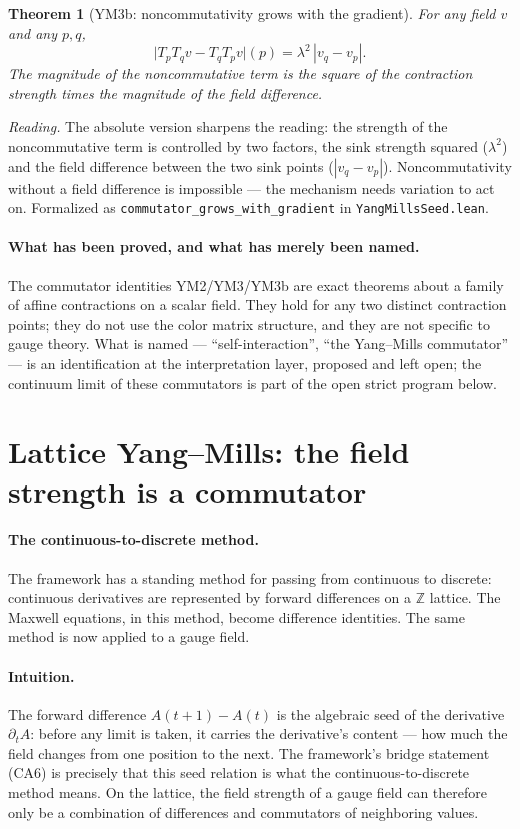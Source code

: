 \documentclass[aps,prd,preprint,superscriptaddress,amsmath,amssymb]{revtex4-2}
\newtheorem{theorem}{Theorem}[section]
\begin{document}
\begin{theorem}[YM3b: noncommutativity grows with the gradient]
\label{thm:ym3b}
For any field $v$ and any $p,q$,
\begin{equation}
\bigl|T_p T_q v - T_q T_p v\bigr|(p) = \lambda^2\,|v_q-v_p|.
\end{equation}
The magnitude of the noncommutative term is the square of the
contraction strength times the magnitude of the field difference.
\end{theorem}

\emph{Reading.}  The absolute version sharpens the reading: the
strength of the noncommutative term is controlled by two factors, the
sink strength squared ($\lambda^2$) and the field difference between
the two sink points ($|v_q-v_p|$).  Noncommutativity without a field
difference is impossible --- the mechanism needs variation to act on.
Formalized as \texttt{commutator\_grows\_with\_gradient} in
\texttt{YangMillsSeed.lean}.

\paragraph{What has been proved, and what has merely been named.}
The commutator identities YM2/YM3/YM3b are exact theorems about a
family of affine contractions on a scalar field.  They hold for any
two distinct contraction points; they do not use the color matrix
structure, and they are not specific to gauge theory.  What is named
--- ``self-interaction'', ``the Yang--Mills commutator'' --- is an
identification at the interpretation layer, proposed and left open;
the continuum limit of these commutators is part of the open strict
program below.

\section{Lattice Yang--Mills: the field strength is a commutator}
\label{sec:lattice}

\paragraph{The continuous-to-discrete method.}
The framework has a standing method for passing from continuous to
discrete: continuous derivatives are represented by forward
differences on a $\mathbb{Z}$ lattice.  The Maxwell equations, in
this method, become difference identities.  The same method is now
applied to a gauge field.

\paragraph{Intuition.}  The forward difference
$A(t{+}1)-A(t)$ is the algebraic seed of the derivative
$\partial_t A$: before any limit is taken, it carries the derivative's
content --- how much the field changes from one position to the next.
The framework's bridge statement (CA6) is precisely that this seed
relation is what the continuous-to-discrete method means.  On the
lattice, the field strength of a gauge field can therefore only be a
combination of differences and commutators of neighboring values.
\end{document}
